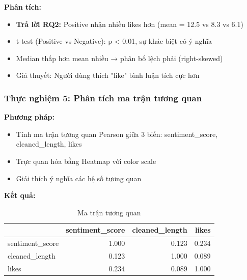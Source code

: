\textbf{Phân tích:}
\begin{itemize}
    \item \textbf{Trả lời RQ2:} Positive nhận nhiều likes hơn (mean = 12.5 vs 8.3 vs 6.1)
    \item t-test (Positive vs Negative): p < 0.01, sự khác biệt có ý nghĩa
    \item Median thấp hơn mean nhiều → phân bố lệch phải (right-skewed)
    \item Giả thuyết: Người dùng thích "like" bình luận tích cực hơn
\end{itemize}

\subsubsection{Thực nghiệm 5: Phân tích ma trận tương quan}

\textbf{Phương pháp:}
\begin{itemize}
    \item Tính ma trận tương quan Pearson giữa 3 biến: sentiment\_score, cleaned\_length, likes
    \item Trực quan hóa bằng Heatmap với color scale
    \item Giải thích ý nghĩa các hệ số tương quan
\end{itemize}

\textbf{Kết quả:}
\begin{table}[H]
\centering
\caption{Ma trận tương quan}
\begin{tabular}{|l|r|r|r|}
\hline
 & \textbf{sentiment\_score} & \textbf{cleaned\_length} & \textbf{likes} \\
\hline
sentiment\_score & 1.000 & 0.123 & 0.234 \\
\hline
cleaned\_length & 0.123 & 1.000 & 0.089 \\
\hline
likes & 0.234 & 0.089 & 1.000 \\
\hline
\end{tabular}
\end{table}

